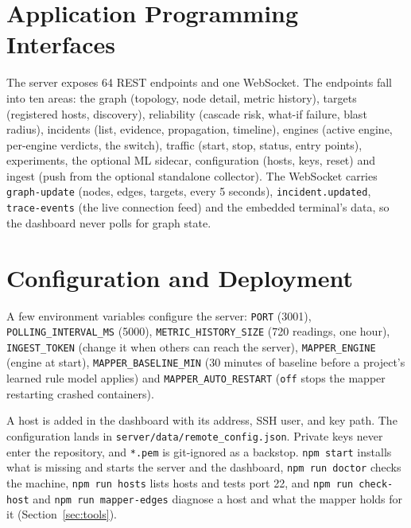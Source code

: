 \section{Application Programming Interfaces}
The server exposes 64 REST endpoints and one WebSocket. The endpoints fall into ten areas: the graph (topology, node detail, metric history), targets (registered hosts, discovery), reliability (cascade risk, what-if failure, blast radius), incidents (list, evidence, propagation, timeline), engines (active engine, per-engine verdicts, the switch), traffic (start, stop, status, entry points), experiments, the optional ML sidecar, configuration (hosts, keys, reset) and ingest (push from the optional standalone collector). The WebSocket carries \texttt{graph-update} (nodes, edges, targets, every 5 seconds), \texttt{incident.updated}, \texttt{trace-events} (the live connection feed) and the embedded terminal's data, so the dashboard never polls for graph state.

\section{Configuration and Deployment}
\begin{sloppypar}
A few environment variables configure the server: \texttt{PORT} (3001), \texttt{POLLING\_INTERVAL\_MS} (5000), \texttt{METRIC\_HISTORY\_SIZE} (720 readings, one hour), \texttt{INGEST\_TOKEN} (change it when others can reach the server), \texttt{MAPPER\_ENGINE} (engine at start), \texttt{MAPPER\_BASELINE\_MIN} (30 minutes of baseline before a project's learned rule model applies) and \texttt{MAPPER\_AUTO\_RESTART} (\texttt{off} stops the mapper restarting crashed containers).
\end{sloppypar}

A host is added in the dashboard with its address, SSH user, and key path. The configuration lands in \texttt{server/data/remote\_config.json}. Private keys never enter the repository, and \texttt{*.pem} is git-ignored as a backstop. \texttt{npm start} installs what is missing and starts the server and the dashboard, \texttt{npm run doctor} checks the machine, \texttt{npm run hosts} lists hosts and tests port 22, and \texttt{npm run check-host} and \texttt{npm run mapper-edges} diagnose a host and what the mapper holds for it (Section~\ref{sec:tools}).


